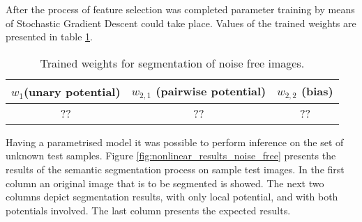 After the process of feature selection was completed parameter training by means of Stochastic Gradient Descent could take place. Values of the trained weights are presented in table \ref{table:weights_nonlinear_noise_free}.
\begin{table}[ht]
\caption{Trained weights for segmentation of noise free images.}
\centering
\begin{tabular}{|c|c|c|}
\hline
\rowcolor[HTML]{C0C0C0} 
$w_1$(unary potential) & $w_{2,1}$ (pairwise potential) & $w_{2,2}$ (bias) \\ \hline
?? & ?? & ?? \\ \hline
\end{tabular}
\label{table:weights_nonlinear_noise_free}
\end{table}

Having a parametrised model it was possible to perform inference on the set of unknown test samples. Figure \ref{fig:nonlinear_results_noise_free} presents the results of the semantic segmentation process on sample test images. In the first column an original image that is to be segmented is showed. The next two columns depict segmentation results, with only local potential, and with both potentials involved. The last column presents the expected results.  

